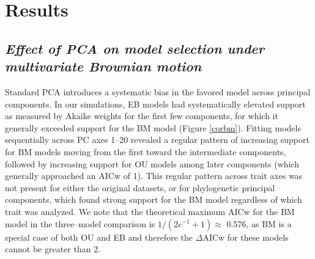 \documentclass[a4paper,12pt]{article}
\begin{document}



\section{Results}
\subsection{\emph{Effect of PCA on model selection under multivariate Brownian motion}}
Standard PCA introduces a systematic bias in the favored model across principal components. In our simulations, EB models had systematically elevated support as measured by Akaike weights for the first few components, for which it generally exceeded support for the BM model (Figure \ref{corbm}). Fitting models sequentially across PC axes 1--20 revealed a regular pattern of increasing support for BM models moving from the first toward the intermediate components, followed by increasing support for OU models among later components (which generally approached an AICw of 1). This regular pattern across trait axes was not present for either the original datasets, or for phylogenetic principal components, which found strong support for the BM model regardless of which trait was analyzed. We note that the theoretical maximum AICw for the BM model in the three--model comparison is $1/(2e^{-1} + 1) \approx$ 0.576, as BM is a special case of both OU and EB and therefore the $\Delta$AICw for these models cannot be greater than 2.   
\end{document}
